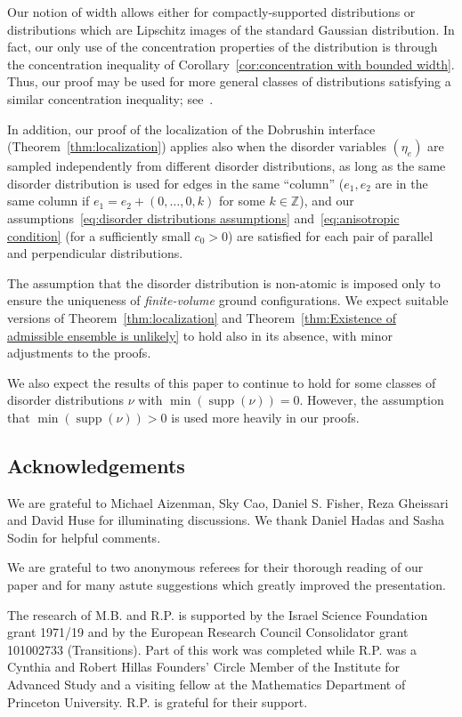 \documentclass[11pt, reqno]{amsart}
\newcommand{\Z}{\mathbb{Z}}
\DeclareMathOperator{\supp}{supp}
\numberwithin{equation}{section}
\begin{document}
Our notion of width allows either for compactly-supported distributions or distributions which are Lipschitz images of the standard Gaussian distribution. In fact, our only use of the concentration properties of the distribution is through the concentration inequality of Corollary~\ref{cor:concentration with bounded width}. Thus, our proof may be used for more general classes of distributions satisfying a similar concentration inequality; see~\cites{GRST17, GRSST18}.

In addition, our proof of the localization of the Dobrushin interface (Theorem~\ref{thm:localization}) applies also when the disorder variables $(\eta_e)$ are sampled independently from different disorder distributions, as long as the same disorder distribution is used for edges in the same ``column'' ($e_1,e_2$ are in the same column if $e_1 = e_2+(0,\ldots,0,k)$ for some $k\in\Z$), and our assumptions~\eqref{eq:disorder distributions assumptions} and~\eqref{eq:anisotropic condition} (for a sufficiently small $c_0>0$) are satisfied for each pair of parallel and perpendicular distributions.

The assumption that the disorder distribution is non-atomic is imposed only to ensure the uniqueness of \emph{finite-volume} ground configurations. We expect suitable versions of Theorem~\ref{thm:localization} and Theorem~\ref{thm:Existence of admissible ensemble is unlikely} to hold also in its absence, with minor adjustments to the proofs.

We also expect the results of this paper to continue to hold for some classes of disorder distributions $\nu$ with $\min(\supp(\nu))=0$. However, the assumption that $\min(\supp(\nu))>0$ is used more heavily in our proofs.

\subsection*{Acknowledgements}
We are grateful to Michael Aizenman, Sky Cao, Daniel S. Fisher, Reza Gheissari and David Huse for illuminating discussions. We thank Daniel Hadas and Sasha Sodin for helpful comments.

We are grateful to two anonymous referees for their thorough reading of our paper and for many astute suggestions which greatly improved the presentation.

The research of M.B. and R.P. is supported by the Israel Science Foundation grant
1971/19 and by the European Research Council Consolidator grant 101002733 (Transitions). Part of this work was completed while R.P. was a Cynthia and Robert Hillas Founders' Circle Member of the Institute for Advanced Study and a visiting fellow at the Mathematics Department of Princeton University. R.P. is grateful for their support.
\end{document}
